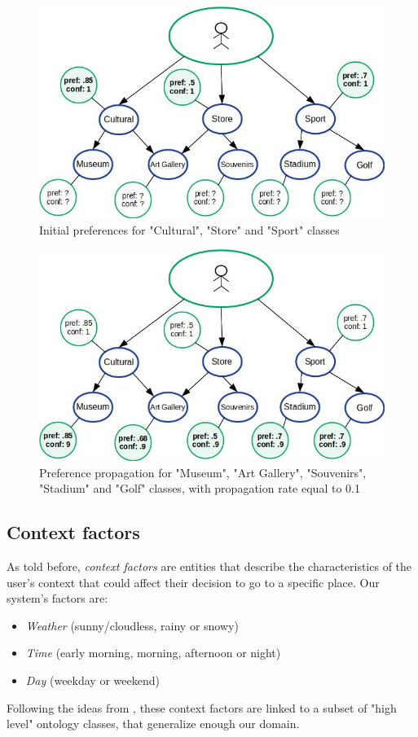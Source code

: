 \begin{figure}[h]
\centering
\includegraphics[scale=0.5]{draws/initial_pref.jpg}
\caption{Initial preferences for "Cultural", "Store" and "Sport" classes}
\label{fig:initial_pref}
\end{figure}

\begin{figure}[h]
\centering
\includegraphics[scale=0.5]{draws/pref_spred.jpg}
\caption{Preference propagation for "Museum", "Art Gallery", "Souvenirs", "Stadium" and "Golf" classes, with propagation rate equal to 0.1}
\label{fig:pref_prop}
\end{figure}

\subsection{Context factors} \label{section:context_factors}
As told before, \textit{context factors} are entities that describe the characteristics of the user's context that could affect their decision to go to a specific place. Our system's factors are: 
\begin{itemize}
    \item \textit{Weather} (sunny/cloudless, rainy or snowy)
    \item \textit{Time} (early morning, morning, afternoon or night)
    \item \textit{Day} (weekday or weekend)
\end{itemize}
Following the ideas from \cite{bahramian_abbaspour_claramunt_2017}, these context factors are linked to a subset of "high level" ontology classes, that generalize enough our domain. 

